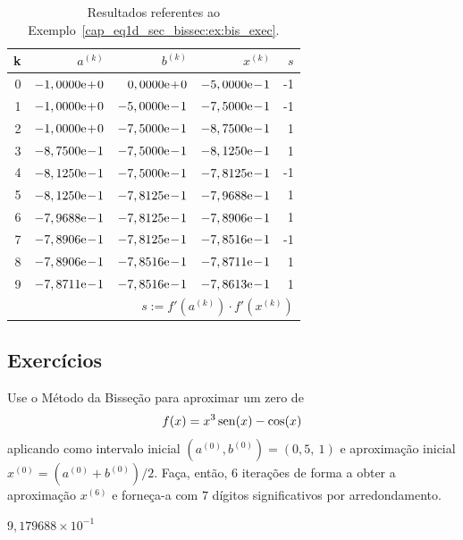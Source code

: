 \begin{ex}
\begin{table}[H]
  \centering
  \caption{Resultados referentes ao Exemplo~\ref{cap_eq1d_sec_bissec:ex:bis_exec}.}
  \begin{tabular}{r|rr|r|r}
    k & $a^{(k)}$ & $b^{(k)}$ & $x^{(k)}$ & $s$\\\hline
    0 & $-1,0000\mathrm{e}\!+\!0$ & $0,0000\mathrm{e}\!+\!0$ & $-5,0000\mathrm{e}\!-\!1$ & -1 \\
    1 & $-1,0000\mathrm{e}\!+\!0$ & $-5,0000\mathrm{e}\!-\!1$ & $-7,5000\mathrm{e}\!-\!1$ & -1 \\
    2 & $-1,0000\mathrm{e}\!+\!0$ & $-7,5000\mathrm{e}\!-\!1$ & $-8,7500\mathrm{e}\!-\!1$ & 1 \\
    3 & $-8,7500\mathrm{e}\!-\!1$ & $-7,5000\mathrm{e}\!-\!1$ & $-8,1250\mathrm{e}\!-\!1$ &  1 \\
    4 & $-8,1250\mathrm{e}\!-\!1$ & $-7,5000\mathrm{e}\!-\!1$ & $-7,8125\mathrm{e}\!-\!1$ & -1 \\
    5 & $-8,1250\mathrm{e}\!-\!1$ & $-7,8125\mathrm{e}\!-\!1$ & $-7,9688\mathrm{e}\!-\!1$ & 1 \\
    6 & $-7,9688\mathrm{e}\!-\!1$ & $-7,8125\mathrm{e}\!-\!1$ & $-7,8906\mathrm{e}\!-\!1$ & 1 \\
    7 & $-7,8906\mathrm{e}\!-\!1$ & $-7,8125\mathrm{e}\!-\!1$ & $-7,8516\mathrm{e}\!-\!1$ & -1 \\
    8 & $-7,8906\mathrm{e}\!-\!1$ & $-7,8516\mathrm{e}\!-\!1$ & $-7,8711\mathrm{e}\!-\!1$ & 1 \\
    9 & $-7,8711\mathrm{e}\!-\!1$ & $-7,8516\mathrm{e}\!-\!1$ & $-7,8613\mathrm{e}\!-\!1$ & 1 \\\hline
    \multicolumn{5}{r}{\small $s := f'(a^{(k)})\cdot f'(x^{(k)})$}
  \end{tabular}
  \label{cap_eq1d_sec_bissec:tab:bis_multpar}
\end{table}
\end{ex}

\subsection{Exercícios}

\begin{exer}
  Use o Método da Bisseção para aproximar um zero de
  \begin{equation}
    f(x)=x^3\operatorname{sen}(x)-\cos(x)
\end{equation}
aplicando como intervalo inicial $(a^{(0)}, b^{(0)}) = (0,5, ~1)$ e aproximação inicial $x^{(0)}=(a^{(0)}+b^{(0)})/2$. Faça, então, $6$ iterações de forma a obter a aproximação $x^{(6)}$ e forneça-a com $7$ dígitos significativos por arredondamento.
\end{exer}
\begin{resp}
  $9,179688\times 10^{-1}$
\end{resp}

